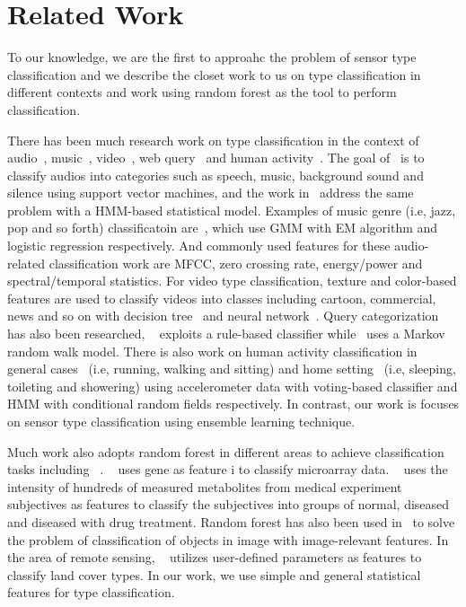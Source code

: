 \section{Related Work}
To our knowledge, we are the first to approahc the problem of sensor type classification and we describe the closet work to us on type classification in different contexts and work using random forest as the tool to perform classification. 

There has been much research work on type classification in the context of audio~\cite{audio1,audio2}, music~\cite{music1,music2}, video~\cite{video1,video2}, 
web query~\cite{query1,query2} and human activity~\cite{activity1, activity2}. The goal of~\cite{audio1} is to classify audios into categories such as speech, 
music, background sound and silence using support vector machines, and the work in~\cite{audio2} address the same problem with a HMM-based statistical model. 
Examples of music genre (i.e, jazz, pop and so forth) classificatoin are~\cite{music1,music2}, which use GMM with EM algorithm and logistic regression
respectively. And commonly used features for these audio-related classification work are MFCC, zero crossing rate, energy/power and spectral/temporal statistics. 
For video type classification, texture and color-based features are used to classify videos into classes including cartoon, commercial, news and so on 
with decision tree~\cite{video1} and neural network~\cite{video2}. Query categorization has also been researched, ~\cite{query1} exploits a rule-based classifier
while~\cite{query2} uses a Markov random walk model. There is also work on human activity classification in general cases~\cite{activity1} (i.e, running, walking 
and sitting) and home setting~\cite{activity2} (i.e, sleeping, toileting and showering) using accelerometer data with voting-based classifier and HMM with 
conditional random fields respectively. In contrast, our work is focuses on sensor type classification using ensemble learning technique.

Much work also adopts random forest in different areas to achieve classification tasks including ~\cite{RF1,RF2,RF3,RF4}. ~\cite{RF1} uses gene as feature i
to classify microarray data. ~\cite{RF2} uses the intensity of hundreds of measured metabolites from medical experiment subjectives as features to classify the 
subjectives into groups of normal, diseased and diseased with drug treatment. Random forest has also been used in~\cite{RF3} to solve the problem of classification 
of objects in image with image-relevant features. In the area of remote sensing, ~\cite{RF4} utilizes user-defined parameters as features to classify land cover 
types. In our work, we use simple and general statistical features for type classification.

